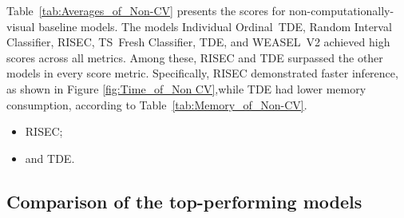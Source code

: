 Table~\ref{tab:Averages_of_Non-CV} presents the scores for non-computationally-visual baseline models. The models Individual \mbox{Ordinal TDE}, Random Interval Classifier, \gls{RISEC}, \mbox{TS Fresh} Classifier, \gls{TDE}, and \mbox{WEASEL V2} achieved high scores across all metrics. Among these, \gls{RISEC} and \gls{TDE} surpassed the other models in every score metric. Specifically, \gls{RISEC} demonstrated faster inference, as shown in Figure \ref{fig:Time_of_Non CV},while \gls{TDE} had lower memory consumption, according to Table~\ref{tab:Memory_of_Non-CV}.  
\begin{itemize}
	\item \gls{RISEC};
	\item and \gls{TDE}.
\end{itemize}








\FloatBarrier

\subsection{Comparison of the top-performing models}


